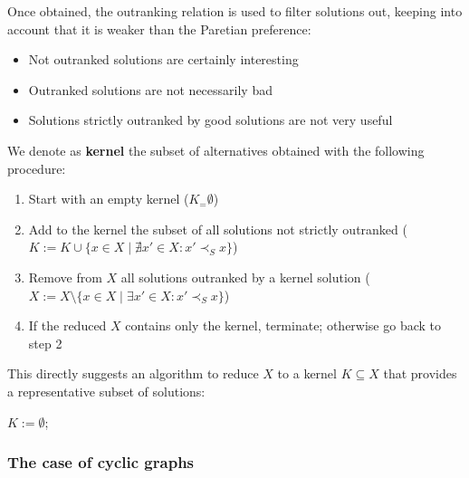Once obtained, the outranking relation is used to filter solutions out, keeping into account that it is weaker than the Paretian preference: 
\begin{itemize}
	\item Not outranked solutions are certainly interesting
	
	\item Outranked solutions are not necessarily bad
	
	\item Solutions strictly outranked by good solutions are not very useful \\
\end{itemize}

\begin{definition}
	We denote as \textbf{kernel} the subset of alternatives obtained with the following procedure: 
	\begin{enumerate}
		\item Start with an empty kernel ($K _= \emptyset$)
		
		\item Add to the kernel the subset of all solutions not strictly outranked ($K := K \cup \{x \in X \mid \nexists x' \in X : x' \prec_S x \}$)
		
		\item Remove from $X$ all solutions outranked by a kernel solution ($X:= X \setminus \{x \in X \mid \exists x' \in X : x' \prec_S x \}$)
		
		\item If the reduced $X$ contains only the kernel, terminate; otherwise go back to step 2
	\end{enumerate}
\end{definition}

This directly suggests an algorithm to reduce $X$ to a kernel $K \subseteq X$ that provides a representative subset of solutions:
\begin{myalgo}{0.95}
	$K:=\emptyset$; \\
\end{myalgo}

\subsubsection{The case of cyclic graphs}

